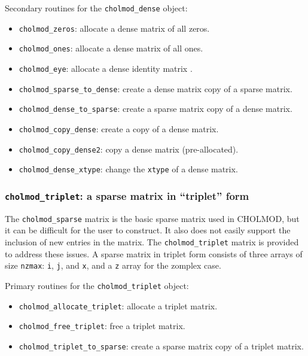 \documentclass[11pt]{article}
\begin{document}
\vspace{0.1in}
\noindent Secondary routines for the {\tt cholmod\_dense} object:
    \begin{itemize}
    \item {\tt cholmod\_zeros}: allocate a dense matrix of all zeros.
    \item {\tt cholmod\_ones}: allocate a dense matrix of all ones.
    \item {\tt cholmod\_eye}: allocate a dense identity matrix .
    \item {\tt cholmod\_sparse\_to\_dense}: create a dense matrix copy of a sparse matrix.
    \item {\tt cholmod\_dense\_to\_sparse}: create a sparse matrix copy of a dense matrix.
    \item {\tt cholmod\_copy\_dense}: create a copy of a dense matrix.
    \item {\tt cholmod\_copy\_dense2}: copy a dense matrix (pre-allocated).
    \item {\tt cholmod\_dense\_xtype}: change the {\tt xtype} of a dense matrix.
    \end{itemize}

\newpage \subsubsection{{\tt cholmod\_triplet}: a sparse matrix in ``triplet'' form}
    The {\tt cholmod\_sparse} matrix is the basic sparse matrix used in
    CHOLMOD, but it can be difficult for the user to construct.  It also
    does not easily support the inclusion of new entries in the matrix.
    The {\tt cholmod\_triplet} matrix is provided to address these issues.
    A sparse matrix in triplet form consists of three arrays of size
    {\tt nzmax}: {\tt i}, {\tt j}, and {\tt x}, and a {\tt z} array
    for the zomplex case.

\vspace{0.1in}
\noindent Primary routines for the {\tt cholmod\_triplet} object:
    \begin{itemize}
    \item {\tt cholmod\_allocate\_triplet}: allocate a triplet matrix.
    \item {\tt cholmod\_free\_triplet}: free a triplet matrix.
    \item {\tt cholmod\_triplet\_to\_sparse}: create a sparse matrix copy of a triplet matrix.
    \end{itemize}
\end{document}

